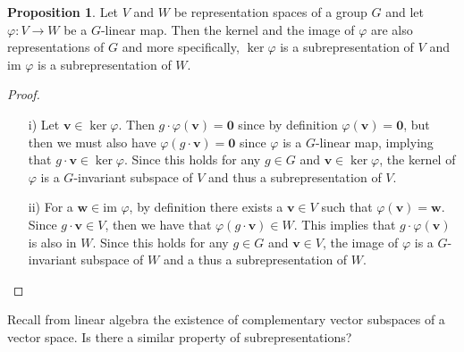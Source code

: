 \documentclass[12pt, a4paper, twoside]{article}
\theoremstyle{definition}
\newtheorem{proposition}[definition]{Proposition}
\theoremstyle{remark}
\numberwithin{equation}{section}
\newcommand{\1}{\mathbf{1}}
\newcommand{\0}{\mathbf{0}}
\newcommand{\im}{\text{im }}
\newcommand{\vvec}{\mathbf{v}}
\newcommand{\wvec}{\mathbf{w}}
\begin{document}
	\begin{proposition}
		Let $V$ and $W$ be representation spaces of a group $G$ and let $\varphi: V \rightarrow W$ be a $G$-linear map. Then the kernel and the image of $\varphi$ are also representations of $G$ and more specifically, $\ker \varphi$ is a subrepresentation of $V$ and $\im \varphi$ is a subrepresentation of $W$. 
	\end{proposition}
	\begin{proof}
		\begin{itemize}
			\item[i)] Let $\vvec \in \ker \varphi$. Then $g \cdot \varphi (\vvec) = \0$ since by definition $\varphi(\vvec) = \0$, but then we must also have $\varphi ( g \cdot \vvec ) = \0$ since $\varphi$ is a $G$-linear map, implying that $g \cdot \vvec \in \ker \varphi$. Since this holds for any $g \in G$ and $\vvec \in \ker \varphi$, the kernel of $\varphi$ is a $G$-invariant subspace of $V$ and thus a subrepresentation of $V$. %
			\item[ii)] For a $\wvec \in \im \varphi$, by definition there exists a $\vvec \in V$ such that $\varphi(\vvec) = \wvec$. Since $g \cdot \vvec \in V$, then we have that $\varphi ( g \cdot \vvec) \in W$. This implies that $g \cdot \varphi (\vvec)$ is also in $W$. Since this holds for any $g \in G$ and $\vvec \in V$, the image of $\varphi$ is a $G$-invariant subspace of $W$ and a thus a subrepresentation of $W$.	\qedhere
		\end{itemize}
	\end{proof}
	
	
	
	
	Recall from linear algebra the existence of complementary vector subspaces of a vector space. Is there a similar property of subrepresentations?
	
\end{document}
